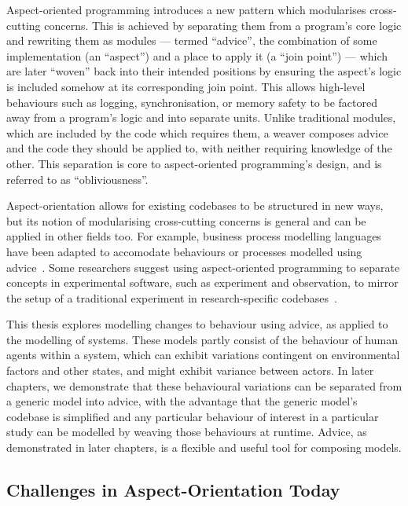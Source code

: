 Aspect-oriented programming introduces a new pattern which modularises cross-cutting concerns. This
is achieved by separating them from a program's core logic and rewriting them as
modules --- termed ``advice'', the combination of some implementation (an
``aspect'') and a place to apply it (a ``join point'') --- which are later ``woven'' back into their
intended positions by ensuring the aspect's logic is included somehow at its
corresponding join point. This allows high-level behaviours such as logging,
synchronisation, or memory safety to be factored away from a program's logic and
into separate units. Unlike traditional modules, which are included by the code which
requires them, a weaver composes advice and the code they should be applied to, with
neither requiring knowledge of the other. This separation is core to aspect-oriented
programming's design, and is referred to as ``obliviousness''.

Aspect-orientation allows for existing codebases to be structured in new ways,
but its notion of modularising cross-cutting concerns is general and can be
applied in other fields too. For example, business process modelling languages
have been adapted to accomodate behaviours or processes modelled using
advice~\cite{Cappelli_AOBPM,da2020implementation,charfi2007ao4bpel}. Some
researchers suggest using aspect-oriented programming to separate concepts in
experimental software, such as experiment and observation, to mirror the setup
of a traditional experiment in research-specific codebases~\cite{gulyas1999use}.

This thesis explores modelling changes to behaviour using advice, as applied to
the modelling of \sociotechnical systems. These models partly consist of the
behaviour of human agents within a system, which can exhibit variations
contingent on environmental factors and other states, and might exhibit variance
between actors. In later chapters, we demonstrate that these behavioural
variations can be separated from a generic model into advice, with the advantage
that the generic model's codebase is simplified and any particular behaviour of
interest in a particular study can be modelled by weaving those behaviours at
runtime. Advice, as demonstrated in later chapters, is a flexible and useful
tool for composing models.


\subsection{Challenges in Aspect-Orientation Today}


